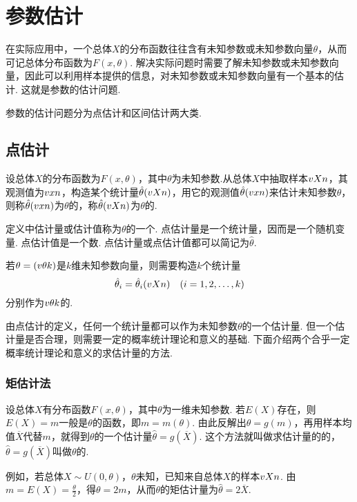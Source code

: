 \chapter{参数估计}
在实际应用中，一个总体\(X\)的分布函数往往含有未知参数或未知参数向量\(\theta\)，从而可记总体分布函数为\(F(x,\theta)\).
解决实际问题时需要了解未知参数或未知参数向量，因此可以利用样本提供的信息，对未知参数或未知参数向量有一个基本的估计.
这就是参数的估计问题.

参数的估计问题分为点估计和区间估计两大类.

\section{点估计}
\begin{definition}
设总体\(X\)的分布函数为\(F(x,\theta)\)，其中\(\theta\)为未知参数.从总体\(X\)中抽取样本\(v{X}{n}\)，其观测值为\(v{x}{n}\)，构造某个统计量\(\hat{\theta}(v{X}{n})\)，用它的观测值\(\hat{\theta}(v{x}{n})\)来估计未知参数\(\theta\)，则称\(\hat{\theta}(v{x}{n})\)为\(\theta\)的，称\(\hat{\theta}(v{X}{n})\)为\(\theta\)的.

定义中估计量或估计值称为\(\theta\)的一个.
点估计量是一个统计量，因而是一个随机变量.
点估计值是一个数.
点估计量或点估计值都可以简记为\(\hat{\theta}\).

若\(\theta=(v{\theta}{k})\)是\(k\)维未知参数向量，则需要构造\(k\)个统计量\[
\hat{\theta}_i = \hat{\theta}_i(v{X}{n}) \quad(i=1,2,\dotsc,k)
\]分别作为\(v{\theta}{k}\)的.
\end{definition}

由点估计的定义，任何一个统计量都可以作为未知参数\(\theta\)的一个估计量.
但一个估计量是否合理，则需要一定的概率统计理论和意义的基础.
下面介绍两个合乎一定概率统计理论和意义的求估计量的方法.

\subsection{矩估计法}
设总体\(X\)有分布函数\(F(x,\theta)\)，其中\(\theta\)为一维未知参数.
若\(E(X)\)存在，则\(E(X)=m\)一般是\(\theta\)的函数，即\(m=m(\theta)\).
由此反解出\(\theta=g(m)\)，再用样本均值\(\overline{X}\)代替\(m\)，就得到\(\theta\)的一个估计量\(\hat{\theta}=g(\overline{X})\).
这个方法就叫做求估计量的的，\(\hat{\theta}=g(\overline{X})\)叫做\(\theta\)的.

例如，若总体\(X \sim U(0,\theta)\)，\(\theta\)未知，已知来自总体\(X\)的样本\(v{X}{n}\).
由\(m = E(X) = \frac{\theta}{2}\)，得\(\theta=2m\)，从而\(\theta\)的矩估计量为\(\hat{\theta} = 2\overline{X}\).

